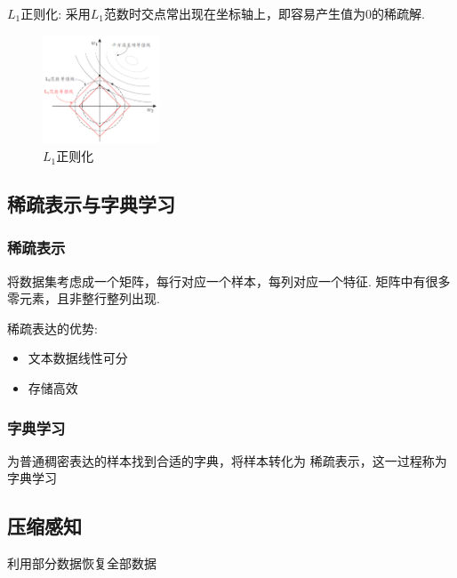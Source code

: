 {$L_1$}正则化: 采用$L_1$范数时交点常出现在坐标轴上，即容易产生值为0的稀疏解. 

\begin{figure}[!htb]
    \centering
    \includegraphics[width=0.309\textwidth]{pic/ML11/L1正则化.png}
    \caption{{$L_1$}正则化}
\end{figure}


\subsection{稀疏表示与字典学习}
\subsubsection{稀疏表示}
将数据集考虑成一个矩阵，每行对应一个样本，每列对应一个特征. 矩阵中有很多零元素，且非整行整列出现. 

稀疏表达的优势:
\begin{itemize}
    \item 文本数据线性可分
    \item 存储高效
\end{itemize}

\subsubsection{字典学习}
为普通稠密表达的样本找到合适的字典，将样本转化为
稀疏表示，这一过程称为字典学习


\subsection{压缩感知}
利用部分数据恢复全部数据